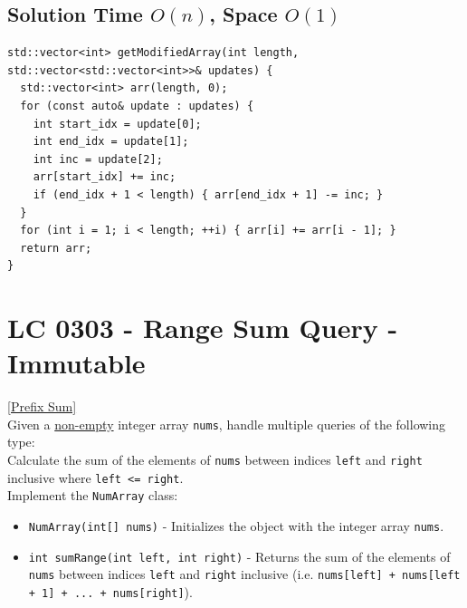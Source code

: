 \subsection*{Solution {\scriptsize\color{gray}\Coffeecup\hspace{1mm}Time $O(n)$, Space $O(1)$}}
\begin{lstlisting}
std::vector<int> getModifiedArray(int length, std::vector<std::vector<int>>& updates) {
  std::vector<int> arr(length, 0);
  for (const auto& update : updates) {
    int start_idx = update[0];
    int end_idx = update[1];
    int inc = update[2];
    arr[start_idx] += inc;
    if (end_idx + 1 < length) { arr[end_idx + 1] -= inc; }
  }
  for (int i = 1; i < length; ++i) { arr[i] += arr[i - 1]; }
  return arr;
}
\end{lstlisting}

\section{LC 0303 - Range Sum Query - Immutable}\label{lc0303}
\hyperref[sec:prefix_sum]{[Prefix Sum]}\\

Given a \ul{non-empty} integer array {\colorbox{CodeBackground}{\lstinline|nums|}}, handle multiple queries of the following type: \\

Calculate the sum of the elements of {\colorbox{CodeBackground}{\lstinline|nums|}} between indices {\colorbox{CodeBackground}{\lstinline|left|}} and {\colorbox{CodeBackground}{\lstinline|right|}} inclusive where {\colorbox{CodeBackground}{\lstinline|left <= right|}}.\\

Implement the {\colorbox{CodeBackground}{\lstinline|NumArray|}} class:
\begin{itemize}
\item {\colorbox{CodeBackground}{\lstinline|NumArray(int[] nums)|}} - Initializes the object with the integer array {\colorbox{CodeBackground}{\lstinline|nums|}}.
\item {\colorbox{CodeBackground}{\lstinline|int sumRange(int left, int right)|}} - Returns the sum of the elements of {\colorbox{CodeBackground}{\lstinline|nums|}} between indices {\colorbox{CodeBackground}{\lstinline|left|}} and {\colorbox{CodeBackground}{\lstinline|right|}} inclusive (i.e. {\colorbox{CodeBackground}{\lstinline|nums[left] + nums[left + 1] + ... + nums[right]|}}).
\end{itemize}

